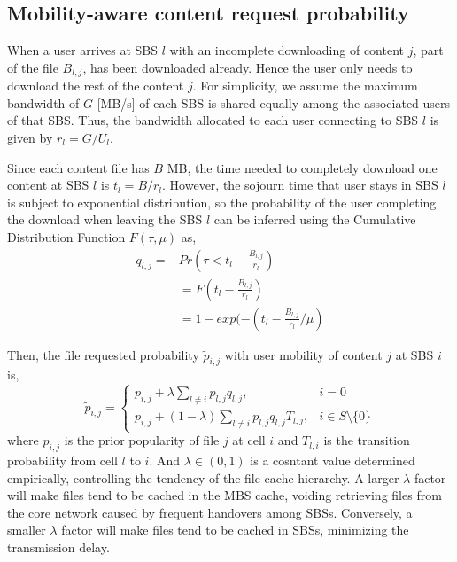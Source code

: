 \documentclass[conference]{IEEEtran}
\begin{document}
\subsection{Mobility-aware content request probability}
When a user arrives at SBS $l$ with an incomplete downloading of content $j$, part of the file $B_{l,j}$, has been downloaded already. Hence the user only needs to download the rest of the content $j$. For simplicity, we assume the maximum bandwidth of $G$ [MB/s] of each SBS is shared equally among the associated users of that SBS\cite{8108779}. Thus, the bandwidth allocated to each user connecting to SBS $l$ is given by $r_l=G/U_l$.

Since each content file has $B$ MB, the time needed to completely download one content at SBS $l$ is $t_l=B/r_l$.
However, the sojourn time that user stays in SBS $l$ is subject to exponential distribution, so the probability of the user completing the download when leaving the SBS $l$ can be inferred using the Cumulative Distribution Function $F(\tau,\mu)$ as,
\begin{equation}
  \begin{aligned}
 q_{l,j}=& Pr(\tau<t_l-\frac{B_{l,j}}{r_l})\\
  &=F(t_l-\frac{B_{l,j}}{r_l})\\
  &=1-exp(-(t_l-\frac{B_{l,j}}{r_l}/\mu)
  \end{aligned}
\end{equation}

Then, the file requested probability ${\tilde{p}_{i,j}}$ with user mobility of content $j$ at SBS $i$ is,
\begin{equation}
{\tilde{p}_{i,j}}=
\begin{cases}
p_{i,j}+\lambda\sum_{l\neq i}p_{l,j}q_{l,j},  & i=0\\
p_{i,j}+(1-\lambda)\sum_{l\neq i}p_{l,j}q_{l,j}T_{l,j}, & i\in S\setminus\{0\}
\end{cases}
\end{equation}
where $p_{i,j}$ is the prior popularity of file $j$ at cell $i$ and $T_{l,i}$ is the transition probability from cell $l$ to $i$. And $\lambda\in(0,1)$ is a cosntant value determined empirically, controlling the tendency of the file cache hierarchy. A larger $\lambda$ factor will make files tend to be cached in the MBS cache, voiding retrieving files from the core network caused by frequent handovers among SBSs. Conversely, a smaller $\lambda$ factor will make files tend to be cached in SBSs, minimizing the transmission delay.
\end{document}
